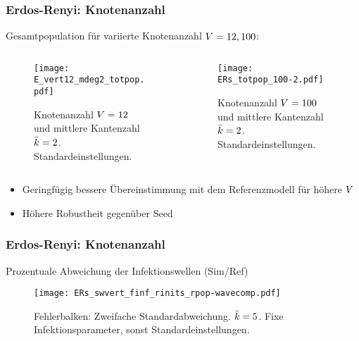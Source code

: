 \begin{frame}[t]
    \frametitle{Erdos-Renyi: Knotenanzahl}
    Gesamtpopulation für variierte Knotenanzahl $V = 12, 100$: 
    \begin{columns}
        \begin{column}{0.5\textwidth}
    \begin{figure}[htpb]
        \centering
        \texttt{[image: E\_vert12\_mdeg2\_totpop.pdf]}
        \caption{Knotenanzahl $V=12$ und mittlere Kantenzahl $\bar{k} = 2$.
        Standardeinstellungen.}%
        \label{fig:E_vert12_mdeg2_totpop}
    \end{figure}
\end{column}
\begin{column}{0.5\textwidth}
    \begin{figure}[htpb]
        \centering
        \texttt{[image: ERs\_totpop\_100-2.pdf]}
        \caption{Knotenanzahl $V=100$ und mittlere Kantenzahl $\bar{k} = 2$.
        Standardeinstellungen.}%
        \label{fig:ERs_totpop_100-2-a}
    \end{figure}
\end{column}
\end{columns}
\begin{itemize}
    \item Geringfügig bessere Übereinstimmung mit dem Referenzmodell für höhere $V$
    \item Höhere Robustheit gegenüber Seed
\end{itemize}
\end{frame}
\begin{frame}[t]
    \frametitle{Erdos-Renyi: Knotenanzahl}
    Prozentuale Abweichung der Infektionswellen (Sim/Ref)
    \begin{figure}[htpb]
        \centering
        \texttt{[image: ERs\_swvert\_finf\_rinits\_rpop-wavecomp.pdf]}
        \caption{Fehlerbalken: Zweifache Standardabweichung. $\bar{k} = 5$. Fixe Infektionsparameter, sonst Standardeinstellungen.}%
        \label{fig:ERs_swvert_finf_rinits_rpop-wavecomp}
    \end{figure}


\end{frame}

